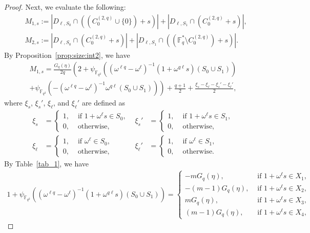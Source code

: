 \documentclass[ALCO,ThmDefs,Unicode]{cedram}
\newcommand*\F{{\mathbb F}}
\begin{document}
\begin{proof}
Next, we evaluate the following:
\begin{align*}
&M_{1,s}:=|D_{\ell,S_0}\cap ((C_0^{(2,q)}\cup \{0\})+s)|+ |D_{\ell,S_1}\cap (C_0^{(2,q)}+s)|,\\
&M_{2,s}:=|D_{\ell,S_0}\cap (C_0^{(2,q)}+s)|+ |D_{\ell,S_1}\cap ((\F_q^\ast \setminus C_0^{(2,q)})+s)|.
\end{align*}
By Proposition~\ref{prop:size:int2}, we have
\begin{multline}
M_{1,s} =\frac{G_q(\eta)}{2q}\left(2+\psi_{\F_{q^2}}((\omega^{\ell q}-\omega^\ell)^{-1}(1+\omega^{q\ell} s)(S_0\cup S_1))\right.\\
\left.+\psi_{\F_{q^2}}(-(\omega^{\ell q}-\omega^\ell)^{-1}\omega^{q\ell}(S_0\cup S_1))\right) +\frac{q+1}{2}+\frac{\xi_s-\xi_{\ell}-\xi_s'-\xi_{\ell}'}{2},\label{eq:com14R}
\end{multline}
where $\xi_s$, $\xi_s'$, $\xi_\ell$, and $\xi_\ell'$ are defined as
\[
\begin{aligned}
\xi_s&=
\begin{cases}
1,& \text{ if } 1+\omega^\ell s\in S_0,\\
0,& \text{ otherwise, }
\end{cases} &
\xi_s'&=
\begin{cases}
1,& \text{ if } 1+\omega^\ell s\in S_1,\\
0,& \text{ otherwise, }
\end{cases}
\\
\xi_\ell&=
\begin{cases}
1,& \text{ if } \omega^\ell \in S_0,\\
0,& \text{ otherwise, }
\end{cases} &
\xi_\ell'&=
\begin{cases}
1,& \text{ if } \omega^\ell \in S_1,\\
0,& \text{ otherwise. }
\end{cases}
\end{aligned}
\]
By Table~\ref{tab_1}, we have
\begin{align*}
1+\psi_{\F_{q^2}}((\omega^{\ell q}-\omega^\ell)^{-1}(1+\omega^{q\ell} s)(S_0\cup S_1)) =
\begin{cases}
-mG_{q}(\eta),& \text{ if } 1+\omega^{\ell} s\in X_1,\\
-(m-1) G_{q}(\eta),& \text{ if } 1+\omega^{\ell} s\in X_2, \\
m G_{q}(\eta),& \text{ if }1+\omega^{\ell} s\in X_3,\\
(m-1) G_{q}(\eta),& \text{ if } 1+\omega^{\ell} s\in X_4,
\end{cases}

\end{align*}
\end{proof}
\end{document}
